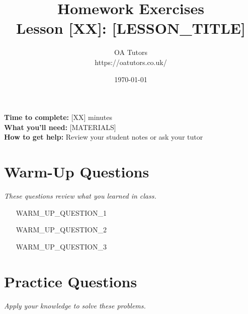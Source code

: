 \documentclass[a4paper,12pt]{article}
\begin{document}
\title{\textcolor{oablue}{\Huge Homework Exercises} \\ 
       \textcolor{oablue}{\Large Lesson [XX]: [LESSON_TITLE]}}
\author{\textcolor{oablue}{OA Tutors} \\ 
        \textcolor{oagray}{https://oatutors.co.uk/}}
\date{\textcolor{oagray}{\today}}

\maketitle

\begin{instruction}
\textbf{Time to complete:} [XX] minutes \\
\textbf{What you'll need:} [MATERIALS] \\
\textbf{How to get help:} Review your student notes or ask your tutor
\end{instruction}

\section{Warm-Up Questions}
\textit{These questions review what you learned in class.}

\begin{enumerate}
    \item [WARM_UP_QUESTION_1]
    
    \vspace{2cm}
    
    \item [WARM_UP_QUESTION_2]
    
    \vspace{2cm}
    
    \item [WARM_UP_QUESTION_3]
    
    \vspace{2cm}
\end{enumerate}

\section{Practice Questions}
\textit{Apply your knowledge to solve these problems.}
\end{document}
